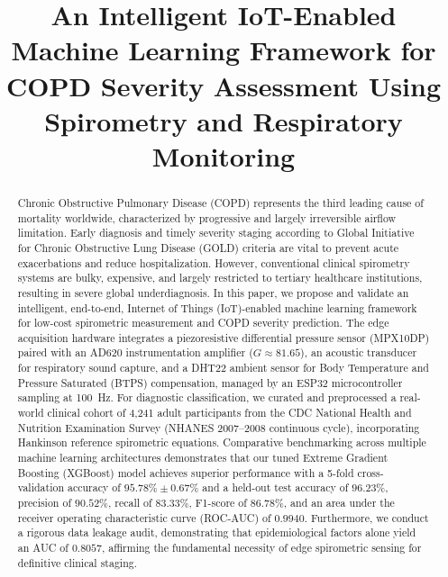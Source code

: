 \documentclass[conference]{IEEEtran}
\begin{document}
\title{An Intelligent IoT-Enabled Machine Learning Framework for COPD Severity Assessment Using Spirometry and Respiratory Monitoring}

\author{
}

\maketitle

\begin{abstract}
Chronic Obstructive Pulmonary Disease (COPD) represents the third leading cause of mortality worldwide, characterized by progressive and largely irreversible airflow limitation. Early diagnosis and timely severity staging according to Global Initiative for Chronic Obstructive Lung Disease (GOLD) criteria are vital to prevent acute exacerbations and reduce hospitalization. However, conventional clinical spirometry systems are bulky, expensive, and largely restricted to tertiary healthcare institutions, resulting in severe global underdiagnosis. In this paper, we propose and validate an intelligent, end-to-end, Internet of Things (IoT)-enabled machine learning framework for low-cost spirometric measurement and COPD severity prediction. The edge acquisition hardware integrates a piezoresistive differential pressure sensor (MPX10DP) paired with an AD620 instrumentation amplifier ($G \approx 81.65$), an acoustic transducer for respiratory sound capture, and a DHT22 ambient sensor for Body Temperature and Pressure Saturated (BTPS) compensation, managed by an ESP32 microcontroller sampling at 100~Hz. For diagnostic classification, we curated and preprocessed a real-world clinical cohort of 4,241 adult participants from the CDC National Health and Nutrition Examination Survey (NHANES 2007--2008 continuous cycle), incorporating Hankinson reference spirometric equations. Comparative benchmarking across multiple machine learning architectures demonstrates that our tuned Extreme Gradient Boosting (XGBoost) model achieves superior performance with a 5-fold cross-validation accuracy of $95.78\% \pm 0.67\%$ and a held-out test accuracy of $96.23\%$, precision of $90.52\%$, recall of $83.33\%$, F1-score of $86.78\%$, and an area under the receiver operating characteristic curve (ROC-AUC) of $0.9940$. Furthermore, we conduct a rigorous data leakage audit, demonstrating that epidemiological factors alone yield an AUC of $0.8057$, affirming the fundamental necessity of edge spirometric sensing for definitive clinical staging.
\end{abstract}
\end{document}
